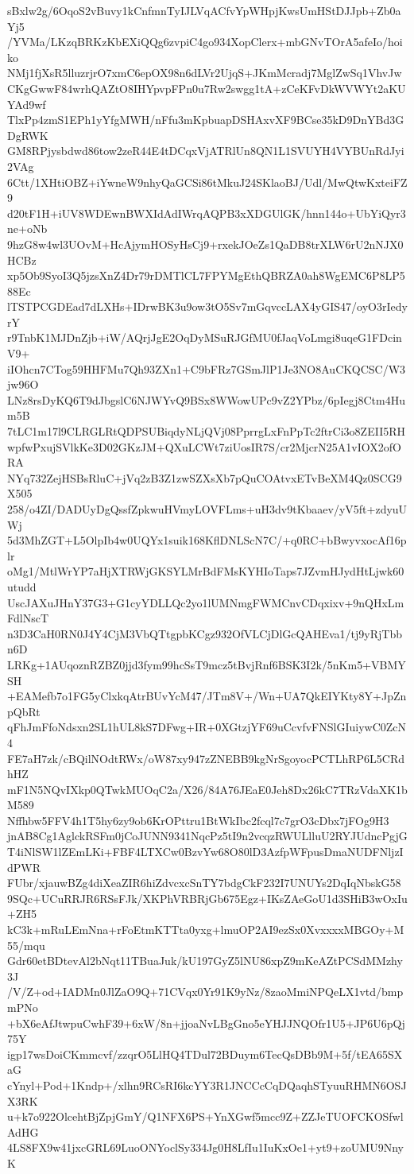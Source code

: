 sBxlw2g/6OqoS2vBuvy1kCnfmnTyIJLVqACfvYpWHpjKwsUmHStDJJpb+Zb0aYj5
/YVMa/LKzqBRKzKbEXiQQg6zvpiC4go934XopClerx+mbGNvTOrA5afeIo/hoiko
NMj1fjXsR5lluzrjrO7xmC6epOX98n6dLVr2UjqS+JKmMcradj7MglZwSq1VhvJw
CKgGwwF84wrhQAZtO8IHYpvpFPn0u7Rw2swgg1tA+zCeKFvDkWVWYt2aKUYAd9wf
TlxPp4zmS1EPh1yYfgMWH/nFfu3mKpbuapDSHAxvXF9BCse35kD9DnYBd3GDgRWK
GM8RPjysbdwd86tow2zeR44E4tDCqxVjATRlUn8QN1L1SVUYH4VYBUnRdJyi2VAg
6Ctt/1XHtiOBZ+iYwneW9nhyQaGCSi86tMkuJ24SKlaoBJ/Udl/MwQtwKxteiFZ9
d20tF1H+iUV8WDEwnBWXIdAdIWrqAQPB3xXDGUlGK/hnn144o+UbYiQyr3ne+oNb
9hzG8w4wl3UOvM+HcAjymHOSyHsCj9+rxekJOeZs1QaDB8trXLW6rU2nNJX0HCBz
xp5Ob9SyoI3Q5jzsXnZ4Dr79rDMTlCL7FPYMgEthQBRZA0ah8WgEMC6P8LP588Ec
lTSTPCGDEad7dLXHs+IDrwBK3u9ow3tO5Sv7mGqvccLAX4yGIS47/oyO3rIedyrY
r9TnbK1MJDnZjb+iW/AQrjJgE2OqDyMSuRJGfMU0fJaqVoLmgi8uqeG1FDcinV9+
iIOhcn7CTog59HHFMu7Qh93ZXn1+C9bFRz7GSmJlP1Je3NO8AuCKQCSC/W3jw96O
LNz8rsDyKQ6T9dJbgslC6NJWYvQ9BSx8WWowUPc9vZ2YPbz/6pIegj8Ctm4Hum5B
7tLC1m17l9CLRGLRtQDPSUBiqdyNLjQVj08PprrgLxFnPpTc2ftrCi3o8ZEII5RH
wpfwPxujSVlkKe3D02GKzJM+QXuLCWt7ziUosIR7S/cr2MjcrN25A1vIOX2ofORA
NYq732ZejHSBsRluC+jVq2zB3Z1zwSZXsXb7pQuCOAtvxETvBeXM4Qz0SCG9X505
258/o4ZI/DADUyDgQssfZpkwuHVmyLOVFLms+uH3dv9tKbaaev/yV5ft+zdyuUWj
5d3MhZGT+L5OlpIb4w0UQYx1suik168KflDNLScN7C/+q0RC+bBwyvxocAf16plr
oMg1/MtlWrYP7aHjXTRWjGKSYLMrBdFMsKYHIoTaps7JZvmHJydHtLjwk60utudd
UscJAXuJHnY37G3+G1cyYDLLQc2yo1lUMNmgFWMCnvCDqxixv+9nQHxLmFdlNscT
n3D3CaH0RN0J4Y4CjM3VbQTtgpbKCgz932OfVLCjDlGcQAHEva1/tj9yRjTbbn6D
LRKg+1AUqoznRZBZ0jjd3fym99hcSsT9mcz5tBvjRnf6BSK3I2k/5nKm5+VBMYSH
+EAMefb7o1FG5yClxkqAtrBUvYcM47/JTm8V+/Wn+UA7QkEIYKty8Y+JpZnpQbRt
qFhJmFfoNdsxn2SL1hUL8kS7DFwg+IR+0XGtzjYF69uCcvfvFNSlGIuiywC0ZcN4
FE7aH7zk/cBQilNOdtRWx/oW87xy947zZNEBB9kgNrSgoyocPCTLhRP6L5CRdhHZ
mF1N5NQvIXkp0QTwkMUOqC2a/X26/84A76JEaE0Jeh8Dx26kC7TRzVdaXK1bM589
Nffhbw5FFV4h1T5hy6zy9ob6KrOPttru1BtWkIbc2fcql7c7grO3cDbx7jFOg9H3
jnAB8Cg1AglckRSFm0jCoJUNN9341NqcPz5tI9n2vcqzRWULlluU2RYJUdncPgjG
T4iNlSW1lZEmLKi+FBF4LTXCw0BzvYw68O80lD3AzfpWFpusDmaNUDFNljzIdPWR
FUbr/xjauwBZg4diXeaZIR6hiZdvcxcSnTY7bdgCkF232I7UNUYs2DqIqNbskG58
9SQc+UCuRRJR6RSsFJk/XKPhVRBRjGb675Egz+IKsZAeGoU1d3SHiB3wOxIu+ZH5
kC3k+mRuLEmNna+rFoEtmKTTta0yxg+lmuOP2AI9ezSx0XvxxxxMBGOy+M55/mqu
Gdr60etBDtevAl2bNqt11TBuaJuk/kU197GyZ5lNU86xpZ9mKeAZtPCSdMMzhy3J
/V/Z+od+IADMn0JlZaO9Q+71CVqx0Yr91K9yNz/8zaoMmiNPQeLX1vtd/bmpmPNo
+bX6eAfJtwpuCwhF39+6xW/8n+jjoaNvLBgGno5eYHJJNQOfr1U5+JP6U6pQj75Y
igp17wsDoiCKmmcvf/zzqrO5LlHQ4TDul72BDuym6TecQsDBb9M+5f/tEA65SXaG
cYnyl+Pod+1Kndp+/xlhn9RCsRI6kcYY3R1JNCCcCqDQaqhSTyuuRHMN6OSJX3RK
u+k7o922OlcehtBjZpjGmY/Q1NFX6PS+YnXGwf5mcc9Z+ZZJeTUOFCKOSfwlAdHG
4LS8FX9w41jxcGRL69LuoONYoclSy334Jg0H8LfIu1IuKxOe1+yt9+zoUMU9NnyK
